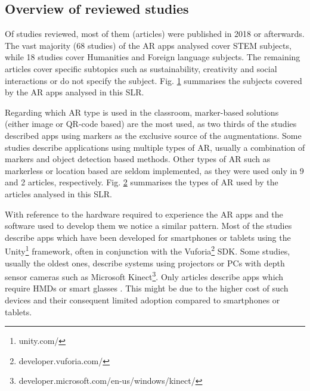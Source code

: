 \subsection{Overview of reviewed studies}

Of \papersSelected studies reviewed, most of them (\papersAfterTwentyEighteen articles) were published in 2018 or afterwards. The vast majority (68 studies) of the AR apps analysed cover STEM subjects, while 18 studies cover Humanities and Foreign language subjects. The remaining articles cover specific subtopics such as sustainability, creativity and social interactions or do not specify the subject. Fig. \ref{fig:subjects} summarises the subjects covered by the AR apps analysed in this \gls{SLR}.

\begin{figure}[htbp]	
	\begin{center}
	
	\captionsetup{font=small}
	\caption{\fontsize{10pt}{11pt}}
	\label{fig:subjects}
    \end{center}
\end{figure}


Regarding which AR type is used in the classroom, marker-based solutions (either image or QR-code based) are the most used, as two thirds of the studies described apps using markers as the exclusive source of the augmentations. 
Some studies describe applications using multiple types of \gls{AR}, usually a combination of markers and object detection based methods. Other types of \gls{AR} such as markerless or location based are seldom implemented, as they were used only in 9 and 2 articles, respectively. Fig. \ref{fig:artech} summarises the types of AR used by the articles analysed in this \gls{SLR}.

\begin{figure}[htbp]	
	\begin{center}
	
	\captionsetup{font=small}
	\caption{\fontsize{10pt}{11pt}}
	\label{fig:artech}
    \end{center}
\end{figure}

With reference to the hardware required to experience the AR apps and the software used to develop them we notice a similar pattern. Most of the studies describe apps which have been developed for smartphones or tablets using the Unity\footnote{unity.com/} framework, often in conjunction with the Vuforia\footnote{developer.vuforia.com/} \gls{SDK}. Some studies, usually the oldest ones, describe systems using projectors or PCs with depth sensor cameras such as Microsoft Kinect\footnote{developer.microsoft.com/en-us/windows/kinect/}. Only \hardwareHMD articles describe apps which require \glspl{HMD} or smart glasses \cite{wei2018improving, oh2016designing, oh2017hybrid, kum2019ar, khan2018mathland, matsutomo2017computer}. This might be due to the higher cost of such devices and their consequent limited adoption compared to smartphones or tablets.

